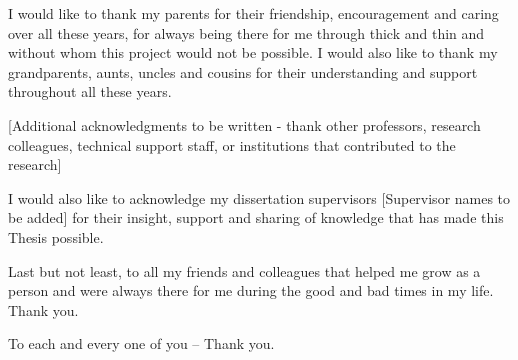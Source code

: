 
I would like to thank my parents for their friendship, encouragement and caring over all these years, for always being there for me through thick and thin and without whom this project would not be possible. I would also like to thank my grandparents, aunts, uncles and cousins for their understanding and support throughout all these years.

[Additional acknowledgments to be written - thank other professors, research colleagues, technical support staff, or institutions that contributed to the research]

I would also like to acknowledge my dissertation supervisors [Supervisor names to be added] for their insight, support and sharing of knowledge that has made this Thesis possible.

Last but not least, to all my friends and colleagues that helped me grow as a person and were always there for me during the good and bad times in my life. Thank you.

To each and every one of you -- Thank you.